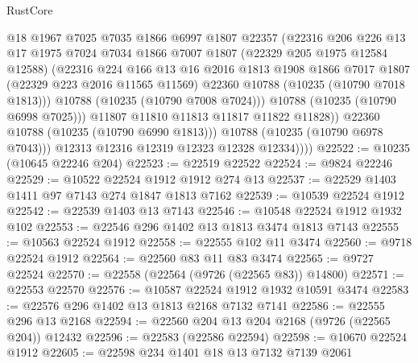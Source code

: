 \begin{lexlean}{RustCore}
\begin{coremodule}
                      @18
                      @1967
                      @7025
                      @7035
                      @1866
                      @6997
                      @1807
                      @22357
                      (@22316
                        @206
                        @226
                        @13
                        @17
                        @1975
                        @7024
                        @7034
                        @1866
                        @7007
                        @1807
                        (@22329 @205 @1975 @12584 @12588)
                        (@22316
                          @224
                          @166
                          @13
                          @16
                          @2016
                          @1813
                          @1908
                          @1866
                          @7017
                          @1807
                          (@22329 @223 @2016 @11565 @11569)
                          @22360
                          @10788
                          (@10235 (@10790 @7018 @1813)))
                        @10788
                        (@10235 (@10790 @7008 @7024)))
                      @10788
                      (@10235 (@10790 @6998 @7025)))
                    @11807
                    @11810
                    @11813
                    @11817
                    @11822
                    @11828))
                @22360
                @10788
                (@10235 (@10790 @6990 @1813)))
              @10788
              (@10235 (@10790 @6978 @7043)))
            @12313
            @12316
            @12319
            @12323
            @12328
            @12334))))
@22522 := @10235 (@10645 @22246 @204)
@22523 := @22519 @22522
@22524 := @9824 @22246
@22529 := @10522 @22524 @1912 @1912 @274 @13
@22537 := @22529 @1403 @1411 @97 @7143 @274 @1847 @1813 @7162
@22539 := @10539 @22524 @1912
@22542 := @22539 @1403 @13 @7143
@22546 := @10548 @22524 @1912 @1932 @102
@22553 := @22546 @296 @1402 @13 @1813 @3474 @1813 @7143
@22555 := @10563 @22524 @1912
@22558 := @22555 @102 @11 @3474
@22560 := @9718 @22524 @1912
@22564 := @22560 @83 @11 @83 @3474
@22565 := @9727 @22524
@22570 := @22558 (@22564 (@9726 (@22565 @83)) @14800)
@22571 := @22553 @22570
@22576 := @10587 @22524 @1912 @1932 @10591 @3474
@22583 := @22576 @296 @1402 @13 @1813 @2168 @7132 @7141
@22586 := @22555 @296 @13 @2168
@22594 := @22560 @204 @13 @204 @2168 (@9726 (@22565 @204)) @12432
@22596 := @22583 (@22586 @22594)
@22598 := @10670 @22524 @1912
@22605 := @22598 @234 @1401 @18 @13 @7132 @7139 @2061

\end{coremodule}
\end{lexlean}
